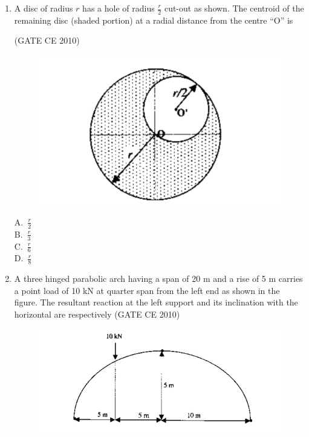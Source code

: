\documentclass[journal,12pt,onecolumn]{exam}
\theoremstyle{remark}
\begin{document}
\begin{enumerate}
\noindent\item A disc of radius $r$ has a hole of radius $\frac{r}{2}$ cut-out as shown. The centroid of the remaining disc (shaded portion) at a radial distance from the centre “O” is

\hfill{(GATE CE 2010)}

\begin{figure}[H]
     \centering
     \includegraphics[scale=0.55]{figs/412a18c6-0377-40d3-8e64-77d6fc371075.jpg} 
     \caption{}
     \label{fig:figure6}
 \end{figure}

\begin{multicols}{4}
A.\ $\frac{r}{2}$ \\
B.\ $\frac{r}{3}$ \\
C.\ $\frac{r}{6}$ \\
D.\ $\frac{r}{8}$
\end{multicols}


\noindent\item A three hinged parabolic arch having a span of 20 m and a rise of 5 m carries a point load of 10 kN at quarter span from the left end as shown in the figure. The resultant reaction at the left support and its inclination with the horizontal are respectively
\hfill{(GATE CE 2010)}

\begin{figure}[H]
     \centering
     \includegraphics[scale=0.55]{figs/32b8c197-51f7-4381-b234-407edc801822.jpg} 
     \caption{}
     \label{fig:figure7}
 \end{figure}


\end{enumerate}
\end{document}
